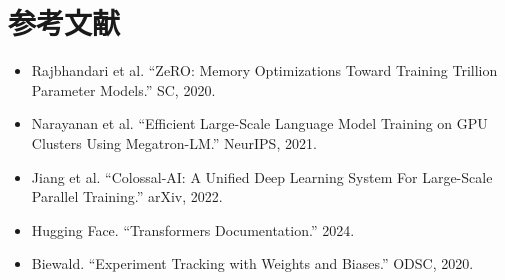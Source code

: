 \documentclass[UTF8,zihao=-4]{ctexart}
\begin{document}
\section*{参考文献}
\begin{itemize}
  \item Rajbhandari et al. ``ZeRO: Memory Optimizations Toward Training Trillion Parameter Models.'' SC, 2020.
  \item Narayanan et al. ``Efficient Large-Scale Language Model Training on GPU Clusters Using Megatron-LM.'' NeurIPS, 2021.
  \item Jiang et al. ``Colossal-AI: A Unified Deep Learning System For Large-Scale Parallel Training.'' arXiv, 2022.
  \item Hugging Face. ``Transformers Documentation.'' 2024.
  \item Biewald. ``Experiment Tracking with Weights and Biases.'' ODSC, 2020.
\end{itemize}
\end{document}
